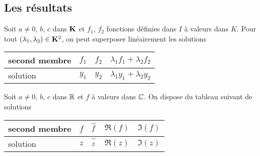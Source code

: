 \subsection{Les résultats}
\begin{prop}
Soit $a\neq 0$, $b$, $c$ dans $\mathbf{K}$ et $f_1$, $f_2$ fonctions définies dans $I$ à valeurs dans $K$. Pour tout $(\lambda_1, \lambda_2)\in \mathbf{K}^2$, on peut superposer linéairement les solutions 
\begin{center}
\renewcommand{\arraystretch}{1.2}
\begin{tabular}{|l|l|l|l|}
\hline
second membre & $f_1$ & $f_2$ & $\lambda_1 f_1 + \lambda_2 f_2$  \\ \hline
solution      & $y_1$ & $y_2$ & $\lambda_1 y_1 + \lambda_2 y_2$  \\ \hline
\end{tabular}
\end{center}
Soit $a\neq 0$, $b$, $c$ dans $\mathbb{R}$ et $f$ à valeurs dans $\mathbb{C}$. On dispose du tableau suivant de solutions
\begin{center}
\renewcommand{\arraystretch}{1.4}
\begin{tabular}{|l|l|l|l|l|}
\hline
second membre & $f$ & $\overline{f\strut}$ & $\Re(f)$ & $\Im(f)$  \\ \hline
solution      & $z$ & $\overline{z\strut}$ & $\Re(z)$ & $\Im(z)$  \\ \hline
\end{tabular}
\end{center}

\end{prop}

